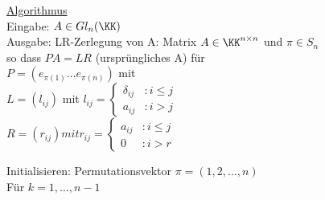 \underline{Algorithmus} \\
Eingabe: $A \in Gl_n (\KK)$ \\
Ausgabe: LR-Zerlegung von A:  Matrix $ A \in \KK^{n \times n}$ und
$\pi \in S_n$ \\
so dass $PA = LR$ (ursprüngliches A) für \\
$P = (e_{\pi(1)} \dots e_{\pi(n)})$ mit \\
$L = (l_{ij}) \text{ mit } l_{ij} =
\begin{cases} \delta_{ij} &: i \le j \\  a_{ij} &: i > j  \end{cases} $ \\
$R = (r_{ij}) mit r_{ij} =
\begin{cases} a_{ij} &: i \le j \\ 0 &: i > r  \end{cases}$

Initialisieren: Permutationsvektor $\pi = (1,2, \dots, n)$\\
Für $k = 1, \dots, n-1$ \\

